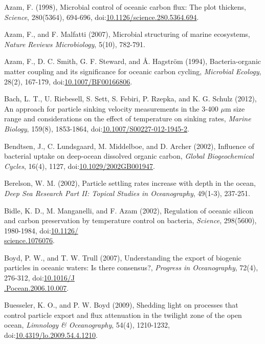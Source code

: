 \begin{singlespace}
{{Azam, F. (1998), Microbial control of oceanic carbon flux: The plot thickens, \emph{Science}, 280(5364), 694-696, doi:\href{http://dx.doi.org/10.1126/science.280.5364.694}{10.1126/science.280.5364.694}.

Azam, F., and F. Malfatti (2007), Microbial structuring of marine ecosystems, \emph{Nature Reviews Microbiology}, 5(10), 782-791.

Azam, F., D. C. Smith, G. F. Steward, and \AA{}. Hagstr\"{o}m (1994), Bacteria-organic matter coupling and its significance for oceanic carbon cycling, \emph{Microbial Ecology}, 28(2), 167-179, doi:\href{http://dx.doi.org/10.1007/BF00166806}{10.1007/BF00166806}.

Bach, L. T., U. Riebesell, S. Sett, S. Febiri, P. Rzepka, and K. G. Schulz (2012), An approach for particle sinking velocity measurements in the 3-400 $\mu$m size range and considerations on the effect of temperature on sinking rates, \emph{Marine Biology}, 159(8), 1853-1864, doi:\href{http://dx.doi.org/10.1007/S00227-012-1945-2}{10.1007/S00227-012-1945-2}.

Bendtsen, J., C. Lundsgaard, M. Middelboe, and D. Archer (2002), Influence of bacterial uptake on deep-ocean dissolved organic carbon, \emph{Global Biogeochemical Cycles}, 16(4), 1127, doi:\href{http://dx.doi.org/10.1029/2002GB001947}{10.1029/2002GB001947}.

Berelson, W. M. (2002), Particle settling rates increase with depth in the ocean, \emph{Deep Sea Research Part II: Topical Studies in Oceanography}, 49(1-3), 237-251.

Bidle, K. D., M. Manganelli, and F. Azam (2002), Regulation of oceanic silicon and carbon preservation by temperature control on bacteria, \emph{Science}, 298(5600), 1980-1984, doi:\href{http://dx.doi.org/10.1126/science.1076076}{10.1126/\\science.1076076}.

Boyd, P. W., and T. W. Trull (2007), Understanding the export of biogenic particles in oceanic waters: Is there consensus?, \emph{Progress in Oceanography}, 72(4), 276-312, doi:\href{http://dx.doi.org/10.1016/J.Pocean.2006.10.007}{10.1016/J\\.Pocean.2006.10.007}.

Buesseler, K. O., and P. W. Boyd (2009), Shedding light on processes that control particle export and flux attenuation in the twilight zone of the open ocean, \emph{Limnology \& Oceanography}, 54(4), 1210-1232, doi:\href{http://dx.doi.org/10.4319/lo.2009.54.4.1210}{10.4319/lo.2009.54.4.1210}.

}}
\end{singlespace}
